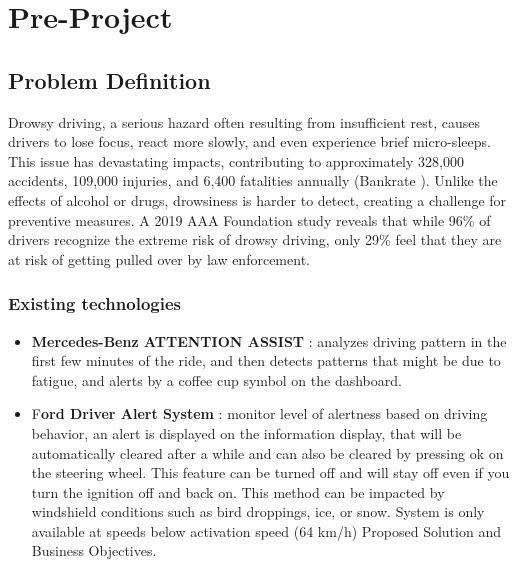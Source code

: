 \documentclass{modeleRapport}
\begin{document}
\fairepagedegarde
\fairetabledesmatieres


\section{Pre-Project}

\subsection{Problem Definition}

Drowsy driving, a serious hazard often resulting from insufficient rest, causes drivers to lose focus, react more slowly, and even experience brief micro-sleeps. This issue has devastating impacts, contributing to approximately 328,000 accidents, 109,000 injuries, and 6,400 fatalities annually (Bankrate \cite{Bankrate}). Unlike the effects of alcohol or drugs, drowsiness is harder to detect, creating a challenge for preventive measures. A 2019 AAA Foundation \cite{AAAFoundation} study reveals that while 96\% of drivers recognize the extreme risk of drowsy driving, only 29\% feel that they are at risk of getting pulled over by law enforcement. 


\subsubsection{Existing technologies}

\begin{itemize}
\item \textbf{Mercedes-Benz ATTENTION ASSIST} \cite{Mercedes}: analyzes driving pattern in the first few minutes of the ride, and then detects patterns that might be due to fatigue, and alerts by a coffee cup symbol on the dashboard.  

\item F\textbf{ord Driver Alert System} \cite{Ford}: monitor level of alertness based on driving behavior, an alert is displayed on the information display, that will be automatically cleared after a while and can also be cleared by pressing ok on the steering wheel. This feature can be turned off and will stay off even if you turn the ignition off and back on. This method can be impacted by windshield conditions such as bird droppings, ice, or snow. System is only available at speeds below activation speed (64 km/h) Proposed Solution and Business Objectives. 
\end{itemize}
\end{document}
